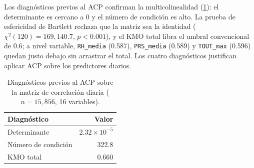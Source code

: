 Los diagnósticos previos al ACP confirman la multicolinealidad
(\cref{tab:diagnostico-pca}): el determinante es cercano a 0 y el número de
condición es alto. La prueba de esfericidad de Bartlett rechaza que la
matriz sea la identidad ($\chi^2(120)=169{,}140.7$, $p<0.001$), y el KMO
total libra el umbral convencional de 0.6; a nivel variable,
\texttt{RH\_media} (0.587), \texttt{PRS\_media} (0.589) y \texttt{TOUT\_max}
(0.596) quedan justo debajo sin arrastrar el total. Los cuatro diagnósticos
justifican aplicar ACP sobre los predictores diarios.

\begin{table}[t]
  \centering
  \caption{Diagnósticos previos al ACP sobre la matriz de correlación
    diaria ($n=15{,}856$, 16 variables).}
  \label{tab:diagnostico-pca}
  \small
  \begin{tabular}{lr}
    \toprule
    Diagnóstico          & Valor \\
    \midrule
    Determinante          & $2.32\times10^{-5}$ \\
    Número de condición   & 322.8 \\
    KMO total             & 0.660 \\
    \bottomrule
  \end{tabular}
\end{table}
